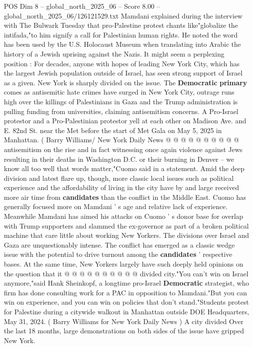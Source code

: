 \begin{textsample}{POS Dim 8 – global\_north\_2025\_06 – Score 8.00 – global\_north\_2025\_06/126121529.txt}  \label{ex:f8_pos_430}
Mamdani explained during the interview with The Bulwark Tuesday that pro-Palestine protest chants like"globalize the intifada,"to him signify a call for Palestinian human rights.
He noted the word has been used by the U.S.
Holocaust Museum when translating into Arabic the history of a Jewish uprising against the Nazis.
It might seem a perplexing position : For decades, anyone with hopes of leading New York City, which has the largest Jewish population outside of Israel, has seen strong support of Israel as a given.
New York is sharply divided on the issue.
The \textbf{Democratic} \textbf{primary} comes as antisemitic hate crimes have surged in New York City, outrage runs high over the killings of Palestinians in Gaza and the Trump administration is pulling funding from universities, claiming antisemitism concerns.
A Pro-Israel protestor and a Pro-Palestinian protestor yell at each other on Madison Ave. and E. 82nd St. near the Met before the start of Met Gala on May 5, 2025 in Manhattan. ( Barry Williams/ New York Daily News @ @ @ @ @ @ @ @ @ @ antisemitism on the rise and in fact witnessing once again violence against Jews resulting in their deaths in Washington D.C. or their burning in Denver -- we know all too well that words matter,"Cuomo said in a statement.
Amid the deep division and latest flare up, though, more classic local issues such as political experience and the affordability of living in the city have by and large received more air time from \textbf{candidates} than the conflict in the Middle East.
Cuomo has generally focused more on Mamdani ' s age and relative lack of experience.
Meanwhile Mamdani has aimed his attacks on Cuomo ' s donor base for overlap with Trump supporters and slammed the ex-governor as part of a broken political machine that care little about working New Yorkers.
The divisions over Israel and Gaza are unquestionably intense.
The conflict has emerged as a classic wedge issue with the potential to drive turnout among the \textbf{candidates} ' respective bases.
At the same time, New Yorkers largely have such deeply held opinions on the question that it @ @ @ @ @ @ @ @ @ @ divided city."You can't win on Israel anymore,"said Hank Sheinkopf, a longtime pro-Israel \textbf{Democratic} strategist, who firm has done consulting work for a PAC in opposition to Mamdani."But you can win on experience, and you can win on policies that don't stand."Students protest for Palestine during a citywide walkout in Manhattan outside DOE Headquarters, May 31, 2024. ( Barry Williams for New York Daily News ) A city divided Over the last 18 months, large demonstrations on both sides of the issue have gripped New York.

\end{textsample}
